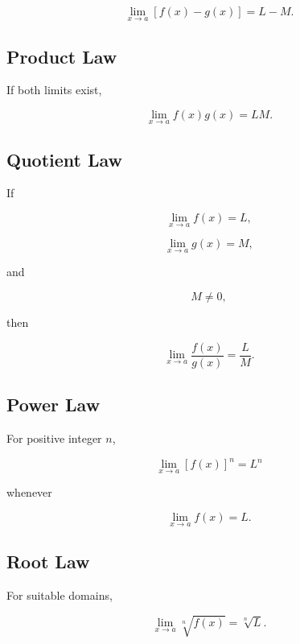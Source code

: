 \[
\boxed{
\lim_{x\to a}
[f(x)-g(x)]
=
L-M.
}
\]

\subsection{Product Law}
\label{subsec:product-limit-law}

If both limits exist,

\[
\boxed{
\lim_{x\to a}
f(x)g(x)
=
LM.
}
\]

\subsection{Quotient Law}
\label{subsec:quotient-limit-law}

If

\[
\lim_{x\to a}f(x)=L,
\]

\[
\lim_{x\to a}g(x)=M,
\]

and

\[
M\neq0,
\]

then

\[
\boxed{
\lim_{x\to a}
\frac{f(x)}{g(x)}
=
\frac{L}{M}.
}
\]

\subsection{Power Law}
\label{subsec:power-limit-law}

For positive integer \(n\),

\[
\boxed{
\lim_{x\to a}
[f(x)]^n
=
L^n
}
\]

whenever

\[
\lim_{x\to a}f(x)=L.
\]

\subsection{Root Law}
\label{subsec:root-limit-law}

For suitable domains,

\[
\boxed{
\lim_{x\to a}
\sqrt[n]{f(x)}
=
\sqrt[n]{L}.
}
\]

